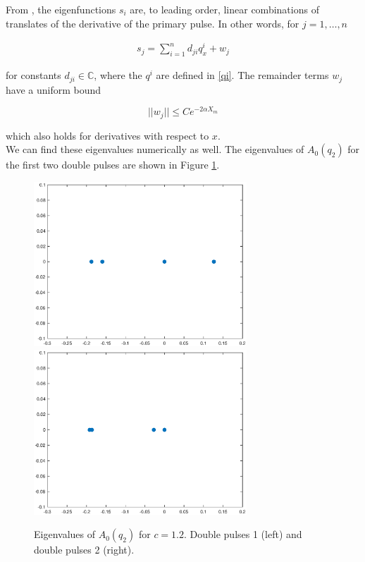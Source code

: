 \documentclass[12pt]{article}
\def\C{{\mathbb C}}
\begin{document}
From \cite{Sandstede1998}, the eigenfunctions $s_i$ are, to leading order, linear combinations of translates of the derivative of the primary pulse. In other words, for $j = 1, \dots, n$

\begin{align}\label{sj}
s_j = \sum_{i = 1}^{n} d_{ji} q^i_x + w_j
\end{align}

for constants $d_{ji} \in \C$, where the $q^i$ are defined in \eqref{qi}. The remainder terms $w_j$ have a uniform bound

\begin{equation}\label{sjwbound}
||w_j|| \leq C e^{-2 \alpha X_m}
\end{equation}

which also holds for derivatives with respect to $x$.\\

We can find these eigenvalues numerically as well. The eigenvalues of $A_0(q_2)$ for the first two double pulses are shown in Figure \ref{fig:specA0double}.

\begin{figure}[H]
\label{fig:specA0double}
\centering
\includegraphics[width=8cm]{specA0d1}
\includegraphics[width=8cm]{specA0d2}
\caption{Eigenvalues of $A_0(q_2)$ for $c = 1.2$. Double pulses 1 (left) and double pulses 2 (right).}
\end{figure}
\end{document}
